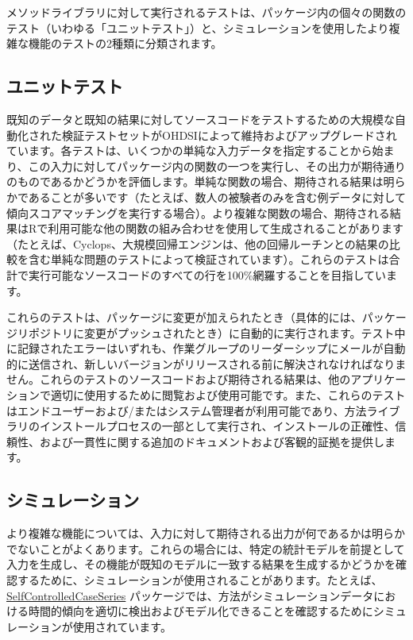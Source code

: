 \documentclass[
  11pt]{book}
\theoremstyle{definition}
\theoremstyle{definition}
\theoremstyle{definition}
\theoremstyle{definition}
\theoremstyle{remark}
\begin{document}
メソッドライブラリに対して実行されるテストは、パッケージ内の個々の関数のテスト（いわゆる「ユニットテスト」）と、シミュレーションを使用したより複雑な機能のテストの2種類に分類されます。

\subsection{ユニットテスト}\label{ux30e6ux30cbux30c3ux30c8ux30c6ux30b9ux30c8}

既知のデータと既知の結果に対してソースコードをテストするための大規模な自動化された検証テストセットがOHDSIによって維持およびアップグレードされています。各テストは、いくつかの単純な入力データを指定することから始まり、この入力に対してパッケージ内の関数の一つを実行し、その出力が期待通りのものであるかどうかを評価します。単純な関数の場合、期待される結果は明らかであることが多いです（たとえば、数人の被験者のみを含む例データに対して傾向スコアマッチングを実行する場合）。より複雑な関数の場合、期待される結果はRで利用可能な他の関数の組み合わせを使用して生成されることがあります（たとえば、Cyclops、大規模回帰エンジンは、他の回帰ルーチンとの結果の比較を含む単純な問題のテストによって検証されています）。これらのテストは合計で実行可能なソースコードのすべての行を100\%網羅することを目指しています。

これらのテストは、パッケージに変更が加えられたとき（具体的には、パッケージリポジトリに変更がプッシュされたとき）に自動的に実行されます。テスト中に記録されたエラーはいずれも、作業グループのリーダーシップにメールが自動的に送信され、新しいバージョンがリリースされる前に解決されなければなりません。これらのテストのソースコードおよび期待される結果は、他のアプリケーションで適切に使用するために閲覧および使用可能です。また、これらのテストはエンドユーザーおよび/またはシステム管理者が利用可能であり、方法ライブラリのインストールプロセスの一部として実行され、インストールの正確性、信頼性、および一貫性に関する追加のドキュメントおよび客観的証拠を提供します。

\subsection{シミュレーション}\label{ux30b7ux30dfux30e5ux30ecux30fcux30b7ux30e7ux30f3}

より複雑な機能については、入力に対して期待される出力が何であるかは明らかでないことがよくあります。これらの場合には、特定の統計モデルを前提として入力を生成し、その機能が既知のモデルに一致する結果を生成するかどうかを確認するために、シミュレーションが使用されることがあります。たとえば、\href{https://ohdsi.github.io/SelfControlledCaseSeries/}{SelfControlledCaseSeries} パッケージでは、方法がシミュレーションデータにおける時間的傾向を適切に検出およびモデル化できることを確認するためにシミュレーションが使用されています。
\end{document}
